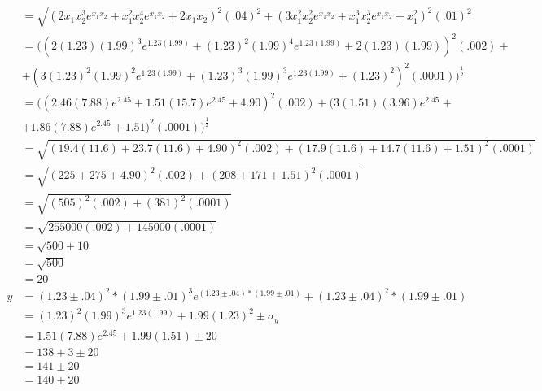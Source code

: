 \documentclass{article}
\begin{document}
\begin{enumerate}
\begin{enumerate}
\begin{align*}
&= \sqrt{(2x_1x_2^3e^{x_1x_2} + x_1^2x_2^4e^{x_1x_2} + 2x_1x_2)^2(.04)^2 + (3x_1^2x_2^2e^{x_1x_2} + x_1^3x_2^3e^{x_1x_2} + x_1^2)^2(.01)^2}\\
&= ((2(1.23)(1.99)^3e^{1.23(1.99)} + (1.23)^2(1.99)^4e^{1.23(1.99)} + 2(1.23)(1.99))^2(.002) +\\
&+ (3(1.23)^2(1.99)^2e^{1.23(1.99)} + (1.23)^3(1.99)^3e^{1.23(1.99)} + (1.23)^2)^2(.0001))^{\frac{1}{2}}\\
&= ((2.46(7.88)e^{2.45} + 1.51(15.7)e^{2.45} + 4.90)^2(.002) + (3(1.51)(3.96)e^{2.45} +\\
&+ 1.86(7.88)e^{2.45} + 1.51)^2(.0001))^{\frac{1}{2}}\\
&= \sqrt{(19.4(11.6) + 23.7(11.6) + 4.90)^2(.002) + (17.9(11.6) + 14.7(11.6) + 1.51)^2(.0001)}\\
&= \sqrt{(225 + 275 + 4.90)^2(.002) + (208 + 171 + 1.51)^2(.0001)}\\
&= \sqrt{(505)^2(.002) + (381)^2(.0001)}\\
&= \sqrt{255000(.002) + 145000(.0001)}\\
&= \sqrt{500 + 10}\\
&= \sqrt{500}\\
&= 20\\
y &= (1.23 \pm .04)^2 * (1.99 \pm .01)^3e^{(1.23 \pm .04) * (1.99 \pm .01)} + (1.23 \pm .04)^2 * (1.99 \pm .01)\\
&= (1.23)^2(1.99)^3e^{1.23(1.99)} + 1.99(1.23)^2 \pm \sigma_{y}\\
&= 1.51(7.88)e^{2.45} + 1.99(1.51) \pm 20\\
&= 138 + 3 \pm 20\\
&= 141 \pm 20\\
&= 140 \pm 20
\end{align*}
\end{enumerate}
\end{enumerate}
\end{document}
